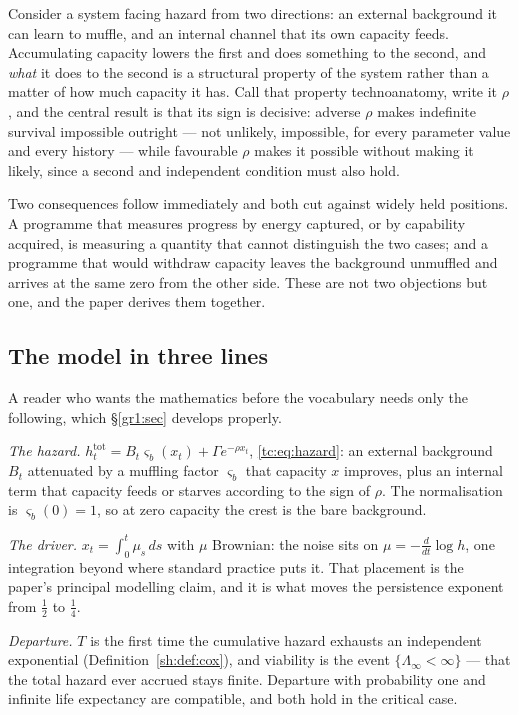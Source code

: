\documentclass[11pt]{article}
\numberwithin{equation}{section}
\theoremstyle{plain}
\theoremstyle{definition}
\theoremstyle{remark}
\begin{document}
Consider a system facing hazard from two directions: an external
background it can learn to muffle, and an internal channel that its own
capacity feeds. Accumulating capacity lowers the first and does something
to the second, and \emph{what} it does to the second is a structural
property of the system rather than a matter of how much capacity it has.
Call that property technoanatomy, write it $\rho$, and the central result
is that its sign is decisive: adverse $\rho$ makes indefinite survival
impossible outright --- not unlikely, impossible, for every parameter
value and every history --- while favourable $\rho$ makes it possible
without making it likely, since a second and independent condition must
also hold.

Two consequences follow immediately and both cut against widely held
positions. A programme that measures progress by energy captured, or by
capability acquired, is measuring a quantity that cannot distinguish the
two cases; and a programme that would withdraw capacity leaves the
background unmuffled and arrives at the same zero from the other side.
These are not two objections but one, and the paper derives them
together.

\subsection{The model in three lines}\label{intro:sub:model}

A reader who wants the mathematics before the vocabulary needs only the
following, which \S\ref{gr1:sec} develops properly.

\emph{The hazard.} $h^{\mathrm{tot}}_t=B_t\varsigma_b(x_t)+\Gamma
e^{-\rho x_t}$, \eqref{tc:eq:hazard}: an external background $B_t$
attenuated by a muffling factor $\varsigma_b$ that capacity $x$ improves,
plus an internal term that capacity feeds or starves according to the
sign of $\rho$. The normalisation is $\varsigma_b(0)=1$, so at zero
capacity the crest is the bare background.

\emph{The driver.} $x_t=\int_0^t\mu_s\,ds$ with $\mu$ Brownian: the noise
sits on $\mu=-\tfrac{d}{dt}\log h$, one integration beyond where standard
practice puts it. That placement is the paper's principal modelling
claim, and it is what moves the persistence exponent from $\tfrac12$ to
$\tfrac14$.

\emph{Departure.} $T$ is the first time the cumulative hazard exhausts an
independent exponential (Definition~\ref{sh:def:cox}), and viability is
the event $\{\Lambda_\infty<\infty\}$ --- that the total hazard ever
accrued stays finite. Departure with probability one and infinite life
expectancy are compatible, and both hold in the critical case.
\end{document}
